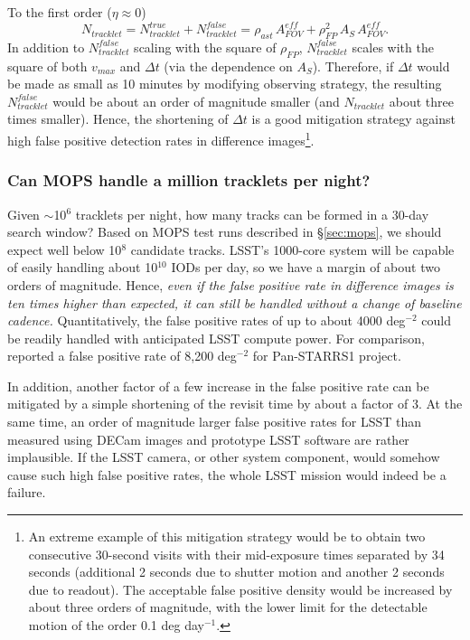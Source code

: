 To the first order ($\eta \approx 0$)
\begin{equation}
   N_{tracklet} =  N_{tracklet}^{true} + N_{tracklet}^{false} = \rho_{ast}  \, A_{FOV}^{eff} + \rho^2_{FP}  \, A_S \, A_{FOV}^{eff}. 
\end{equation}
In addition to $N_{tracklet}^{false}$ scaling with the square of $\rho_{FP}$, $N_{tracklet}^{false}$ scales with the square of
both $v_{max}$ and  $\Delta t$ (via the dependence on $A_S$). Therefore, if $\Delta t$ would be made
as small as 10 minutes by modifying observing strategy, the resulting $N_{tracklet}^{false}$ would be about an 
order of magnitude smaller (and $N_{tracklet}$ about three times smaller).  Hence, the shortening of $\Delta t$ is 
a good mitigation strategy against high false positive detection rates in difference images\footnote{An
extreme example of this mitigation strategy would be to obtain two consecutive 30-second visits with
their mid-exposure times separated 
by 34 seconds (additional 2 seconds due to shutter motion and another 2 seconds due to readout). 
The acceptable false positive density would be increased by about three orders of magnitude, with the
lower limit for the detectable motion of the order 0.1 deg day$^{-1}$.}. 


\subsubsection{Can MOPS handle a million tracklets per night?} 

Given $\sim$10$^6$ tracklets per night, how many tracks can be formed in a 30-day search window? 
Based on MOPS test runs described in \S\ref{sec:mops}, we should expect well below 10$^8$ candidate
tracks. LSST's 1000-core system will be capable of easily handling about 10$^{10}$ IODs per day, so we 
have a margin of about two orders of magnitude. Hence, {\it even if the false positive rate in difference 
images is ten times higher than expected, it can still be handled without a change of baseline cadence.} 
Quantitatively, the false positive rates of up to about 4000 deg$^{-2}$ could be readily handled with 
anticipated LSST compute power. For comparison, \cite{denneau13} reported a false positive 
rate of 8,200 deg$^{-2}$ for Pan-STARRS1 project. 

In addition, another factor of a few increase in the false positive rate can be mitigated by a simple
shortening of the revisit time by about a factor of 3. At the same time, an order of magnitude 
larger false positive rates for LSST than measured using DECam images and prototype LSST software
are rather implausible. If the LSST camera, or other system component, would somehow
cause such high false positive rates, the whole LSST mission would indeed be a failure. 

